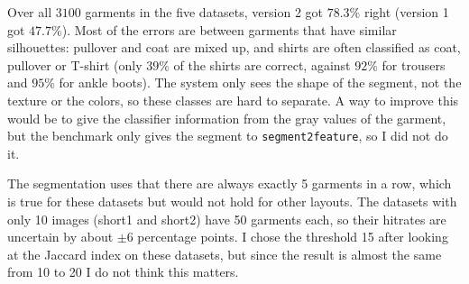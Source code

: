 \documentclass[11pt,a4paper]{article}
\begin{document}
Over all $3100$ garments in the five datasets, version 2 got $78.3\%$ right (version 1 got $47.7\%$). Most of the errors are between garments that
have similar silhouettes: pullover and coat are mixed up, and shirts are often classified as coat, pullover or T-shirt (only $39\%$ of
the shirts are correct, against $92\%$ for trousers and $95\%$ for ankle boots). The system only sees the shape of the segment, not the
texture or the colors, so these classes are hard to separate. A way to improve this would be to give the classifier information from the gray values
of the garment, but the benchmark only gives the segment to \texttt{segment2feature}, so I did not do it.

The segmentation uses that there are always exactly 5 garments in a row, which is true for these datasets but would not hold for other
layouts. The datasets with only 10 images (short1 and short2) have 50 garments each, so their hitrates are uncertain by about $\pm6$ percentage
points. I chose the threshold 15 after looking at the Jaccard index on these datasets, but since the result is almost the same from 10 to 20 I do not
think this matters.
\end{document}
